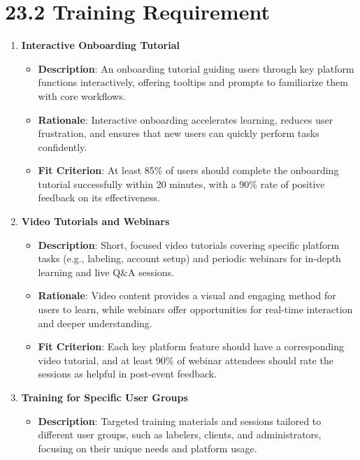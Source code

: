 \documentclass[12pt]{article}
\begin{document}
\section*{23.2 Training Requirement}

\begin{enumerate}
    \item \textbf{Interactive Onboarding Tutorial}  
        \begin{itemize}[leftmargin=2cm]
            \item \textbf{Description}: An onboarding tutorial guiding users through key platform functions interactively, offering tooltips and prompts to familiarize them with core workflows.  
            \item \textbf{Rationale}: Interactive onboarding accelerates learning, reduces user frustration, and ensures that new users can quickly perform tasks confidently.  
            \item \textbf{Fit Criterion}: At least 85\% of users should complete the onboarding tutorial successfully within 20 minutes, with a 90\% rate of positive feedback on its effectiveness.
        \end{itemize}
    \item \textbf{Video Tutorials and Webinars}  
        \begin{itemize}[leftmargin=2cm]
            \item \textbf{Description}: Short, focused video tutorials covering specific platform tasks (e.g., labeling, account setup) and periodic webinars for in-depth learning and live Q\&A sessions.  
            \item \textbf{Rationale}: Video content provides a visual and engaging method for users to learn, while webinars offer opportunities for real-time interaction and deeper understanding.  
            \item \textbf{Fit Criterion}: Each key platform feature should have a corresponding video tutorial, and at least 90\% of webinar attendees should rate the sessions as helpful in post-event feedback.
        \end{itemize}
    \item \textbf{Training for Specific User Groups}  
        \begin{itemize}[leftmargin=2cm]
            \item \textbf{Description}: Targeted training materials and sessions tailored to different user groups, such as labelers, clients, and administrators, focusing on their unique needs and platform usage.  

\end{itemize}
\end{enumerate}
\end{document}
